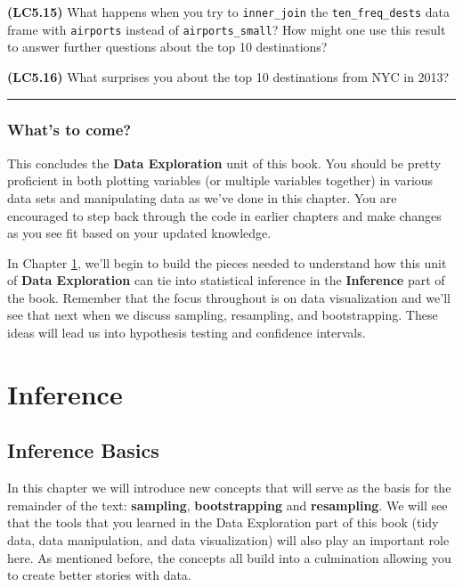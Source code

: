 \documentclass[]{tufte-book}
\let\oldrule=\rule
\renewcommand{\rule}[1]{\oldrule{\linewidth}}
\begin{document}
\textbf{(LC5.15)} What happens when you try to \texttt{inner\_join} the
\texttt{ten\_freq\_dests} data frame with \texttt{airports} instead of
\texttt{airports\_small}? How might one use this result to answer
further questions about the top 10 destinations?

\textbf{(LC5.16)} What surprises you about the top 10 destinations from
NYC in 2013?

\begin{center}\rule{0.5\linewidth}{\linethickness}\end{center}

\section{What's to come?}\label{whats-to-come-2}

This concludes the \textbf{Data Exploration} unit of this book. You
should be pretty proficient in both plotting variables (or multiple
variables together) in various data sets and manipulating data as we've
done in this chapter. You are encouraged to step back through the code
in earlier chapters and make changes as you see fit based on your
updated knowledge.

In Chapter \ref{infer-basics}, we'll begin to build the pieces needed to
understand how this unit of \textbf{Data Exploration} can tie into
statistical inference in the \textbf{Inference} part of the book.
Remember that the focus throughout is on data visualization and we'll
see that next when we discuss sampling, resampling, and bootstrapping.
These ideas will lead us into hypothesis testing and confidence
intervals.

\part{Inference}\label{part-inference}


\chapter{Inference Basics}\label{infer-basics}

In this chapter we will introduce new concepts that will serve as the
basis for the remainder of the text: \textbf{sampling},
\textbf{bootstrapping} and \textbf{resampling}. We will see that the
tools that you learned in the Data Exploration part of this book (tidy
data, data manipulation, and data visualization) will also play an
important role here. As mentioned before, the concepts all build into a
culmination allowing you to create better stories with data.
\end{document}
